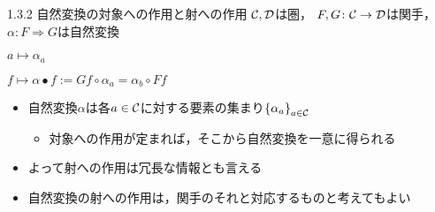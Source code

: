 \documentclass[uplatex,a4paper,dvipdfmx,aspectratio=169,10pt]{beamer}
\begin{document}
\begin{frame}[fragile]{1.3.2 自然変換の対象への作用と射への作用}
    $\mathcal{C}, \mathcal{D}$は圏，
    $F, G \colon \mathcal{C} \to \mathcal{D}$は関手，
    $\alpha \colon F \Rightarrow G$は自然変換
    \begin{description}[対象への作用:]
        \item[対象への作用:] $a \mapsto \alpha_a$
        \item[射への作用:] $f \mapsto \alpha \bullet f := Gf \circ \alpha_a = \alpha_b \circ Ff$
    \end{description}

    \begin{itemize}
        \item 自然変換$\alpha$は各$a \in \mathcal{C}$に対する要素の集まり$\qty{\alpha_a}_{a \in \mathcal{C}}$
            \begin{itemize}
                \item 対象への作用が定まれば，そこから自然変換を一意に得られる
            \end{itemize}
        \item よって射への作用は冗長な情報とも言える
        \item 自然変換の射への作用は，関手のそれと対応するものと考えてもよい
    \end{itemize}


\end{frame}
\end{document}
